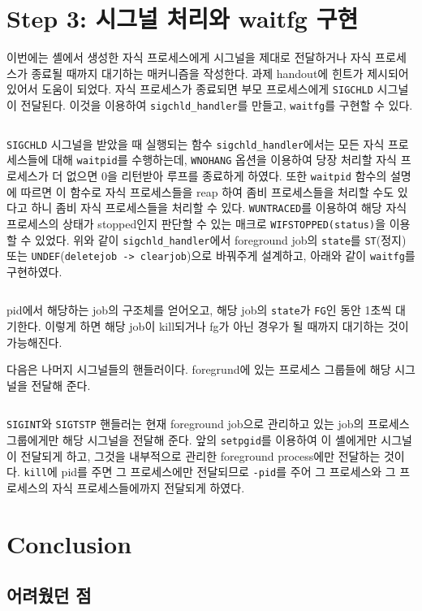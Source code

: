 \documentclass{report}
\begin{document}
\section{Step 3: 시그널 처리와 waitfg 구현}
이번에는 셸에서 생성한 자식 프로세스에게 시그널을 제대로 전달하거나 자식 프로세스가 종료될 때까지 대기하는 매커니즘을 작성한다. 과제 handout에 힌트가 제시되어 있어서 도움이 되었다.
자식 프로세스가 종료되면 부모 프로세스에게 \lstinline{SIGCHLD} 시그널이 전달된다. 이것을 이용하여 \lstinline{sigchld_handler}를 만들고, \lstinline{waitfg}를 구현할 수 있다.
\inputminted[firstline=388,lastline=415, linenos, breaklines]{C}{../shlab/tsh.c}
\lstinline{SIGCHLD} 시그널을 받았을 때 실행되는 함수 \lstinline{sigchld_handler}에서는 모든 자식 프로세스들에 대해 \lstinline{waitpid}를 수행하는데, \lstinline{WNOHANG} 옵션을 이용하여 당장 처리할 자식 프로세스가 더 없으면 0을 리턴받아 루프를 종료하게 하였다. 또한 \lstinline{waitpid} 함수의 설명에 따르면 이 함수로 자식 프로세스들을 reap 하여 좀비 프로세스들을 처리할 수도 있다고 하니 좀비 자식 프로세스들을 처리할 수 있다. \lstinline{WUNTRACED}를 이용하여 해당 자식 프로세스의 상태가 stopped인지 판단할 수 있는 매크로 \lstinline{WIFSTOPPED(status)}을 이용할 수 있었다.
위와 같이 \lstinline{sigchld_handler}에서 foreground job의 \lstinline{state}를 \lstinline{ST}(정지) 또는 \lstinline{UNDEF}(\lstinline{deletejob -> clearjob})으로 바꿔주게 설계하고, 아래와 같이 \lstinline{waitfg}를 구현하였다.
\inputminted[firstline=370,lastline=382, linenos, breaklines]{C}{../shlab/tsh.c}
pid에서 해당하는 job의 구조체를 얻어오고, 해당 job의 \lstinline{state}가 \lstinline{FG}인 동안 1초씩 대기한다. 이렇게 하면 해당 job이 kill되거나 fg가 아닌 경우가 될 때까지 대기하는 것이 가능해진다.

다음은 나머지 시그널들의 핸들러이다. foregrund에 있는 프로세스 그룹들에 해당 시그널을 전달해 준다. 
\inputminted[firstline=417,lastline=445, linenos, breaklines]{C}{../shlab/tsh.c}
\lstinline{SIGINT}와 \lstinline{SIGTSTP} 핸들러는 현재 foreground job으로 관리하고 있는 job의 프로세스 그룹에게만 해당 시그널을 전달해 준다. 앞의 \lstinline{setpgid}를 이용하여 이 셸에게만 시그널이 전달되게 하고, 그것을 내부적으로 관리한 foreground process에만 전달하는 것이다. \lstinline{kill}에 pid를 주면 그 프로세스에만 전달되므로 \lstinline{-pid}를 주어 그 프로세스와 그 프로세스의 자식 프로세스들에까지 전달되게 하였다.

\section{Conclusion}
\subsection{어려웠던 점}
\end{document}
